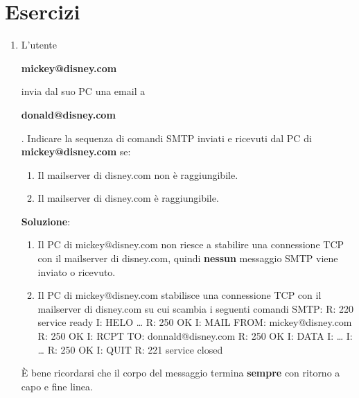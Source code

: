 \documentclass[11pt,a4paper]{article}
\theoremstyle{definition}
\begin{document}
\section{Esercizi}
\begin{enumerate}
	\item L’utente \begin{center}
		      \textbf{mickey@disney.com}
	      \end{center} invia dal suo PC una email a \begin{center}
		      \textbf{donald@disney.com}
	      \end{center}. Indicare la sequenza di comandi SMTP inviati e ricevuti dal PC di \textbf{mickey@disney.com} se:
	      \begin{enumerate}
		      \item Il mailserver di disney.com non è raggiungibile.
		      \item Il mailserver di disney.com è raggiungibile.
	      \end{enumerate}
	      \textbf{Soluzione}:
	      \begin{enumerate}
		      \item Il PC di mickey@disney.com non riesce a stabilire una connessione TCP con il mailserver di disney.com, quindi \textbf{nessun} messaggio SMTP viene inviato o ricevuto.
		      \item  Il PC di mickey@disney.com stabilisce una connessione TCP con il mailserver di
		            disney.com su cui scambia i seguenti comandi SMTP:\newline
		            R: 220 service ready \newline
		            I: HELO …\newline
		            R: 250 OK\newline
		            I: MAIL FROM: mickey@disney.com\newline
		            R: 250 OK \newline
		            I: RCPT TO: donnald@disney.com\newline
		            R: 250 OK \newline
		            I: DATA\newline
		            I: …\newline
		            I: …\newline
		            R: 250 OK\newline
		            I: QUIT\newline
		            R: 221 service closed\newline
	      \end{enumerate}
	      È bene ricordarsi che il corpo del messaggio termina \textbf{sempre} con ritorno a capo e fine linea.


\end{enumerate}
\end{document}
